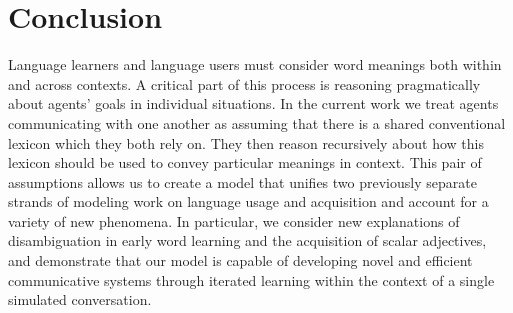 \documentclass{article} %
\begin{document}
%




\section{Conclusion}

Language learners and language users must consider word meanings both
within and across contexts. A critical part of this process is
reasoning pragmatically about agents' goals in individual
situations. In the current work we treat agents communicating
with one another as assuming that there is a shared conventional lexicon
which they both rely on. They then
reason recursively about how this lexicon should be used to convey
particular meanings in context. This pair of assumptions allows us to
create a model that unifies two previously separate strands
of modeling work on language usage and acquisition and account for a
variety of new phenomena. In particular, we consider new
explanations of disambiguation in early word learning and the acquisition of
scalar adjectives, and demonstrate that our model is capable of developing
novel and efficient communicative systems through iterated learning
within the context of a single simulated conversation.
\end{document}
